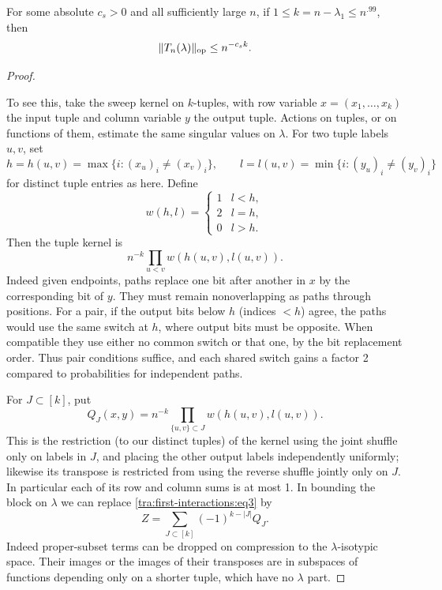 \begin{lemma}\label{tra:first-interactions:sparse}

\label{tra:first-interactions:sparse-statement}
For some absolute \(c_s>0\) and all sufficiently large \(n\), if \(1\le k=n-\lambda_1\le n^{.99}\), then
\begin{equation}
                        \|T_n(\lambda)\|_{\rm op}\le n^{-c_s k}.\label{tra:first-interactions:eq2}
\end{equation}

\end{lemma}\begin{proof}\label{tra:first-interactions:sparse-proof}

\label{tra:first-interactions:endpoint-kernel-and-centered-cover}
To see this, take the sweep kernel on \(k\)-tuples, with row variable \(x=(x_1,\ldots,x_k)\) the input tuple and column variable \(y\) the output tuple. Actions on tuples, or on functions of them, estimate the same singular values on \(\lambda\). For two tuple labels \(u,v\), set
\[
 h=h(u,v)=\max\{i:(x_u)_i\ne(x_v)_i\},\qquad
 l=l(u,v)=\min\{i:(y_u)_i\ne(y_v)_i\}
\]
for distinct tuple entries as here. Define
\[
                   w(h,l)=\begin{cases}1& l<h,\\
                                        2& l=h,\\
                                        0& l>h.
                           \end{cases}
\]
Then the tuple kernel is
\begin{equation}
                         n^{-k}\prod_{u<v} w(h(u,v),l(u,v)).\label{tra:first-interactions:eq3}
\end{equation}
Indeed given endpoints, paths replace one bit after another in \(x\) by the corresponding bit of \(y\). They must remain nonoverlapping as paths through positions. For a pair, if the output bits below \(h\) (indices \(<h\)) agree, the paths would use the same switch at \(h\), where output bits must be opposite. When compatible they use either no common switch or that one, by the bit replacement order. Thus pair conditions suffice, and each shared switch gains a factor 2 compared to probabilities for independent paths.

For \(J\subset [k]\), put
\[
           Q_J(x,y)=n^{-k}\prod_{\{u,v\}\subset J} w(h(u,v),l(u,v)).
\]
This is the restriction (to our distinct tuples) of the kernel using the joint shuffle only on labels in \(J\), and placing the other output labels independently uniformly; likewise its transpose is restricted from using the reverse shuffle jointly only on \(J\). In particular each of its row and column sums is at most 1. In bounding the block on \(\lambda\) we can replace \eqref{tra:first-interactions:eq3} by
\[
                         Z=\sum_{J\subset[k]}(-1)^{k-|J|}Q_J .
\]
Indeed proper-subset terms can be dropped on compression to the \(\lambda\)-isotypic space. Their images or the images of their transposes are in subspaces of functions depending only on a shorter tuple, which have no \(\lambda\) part.


\end{proof}
